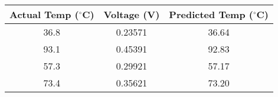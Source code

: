 \begin{tabular}{|c|c|c|}
    \hline
    \textbf{Actual Temp ($^{\circ}$C)} & \textbf{Voltage (V)} & \textbf{Predicted Temp ($^{\circ}$C)} \\
    \hline
    36.8 & 0.23571 & 36.64 \\
    \hline
    93.1 & 0.45391 & 92.83 \\
    \hline
    57.3 & 0.29921 & 57.17 \\
    \hline
    73.4 & 0.35621 & 73.20 \\
    \hline
\end{tabular}

